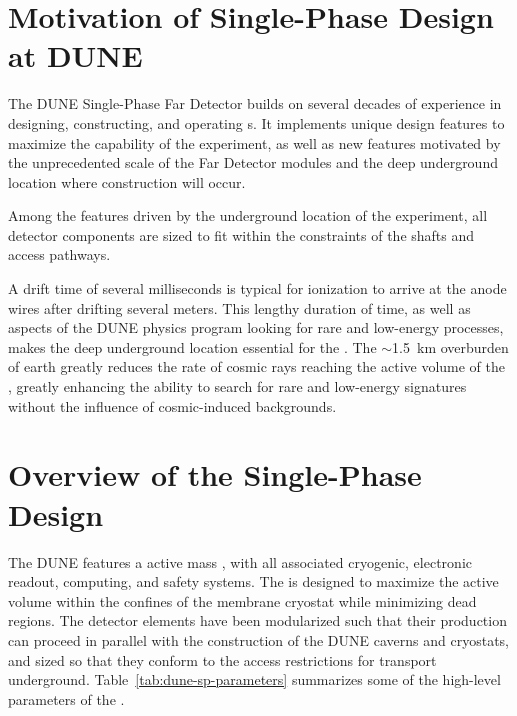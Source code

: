 \section{Motivation of Single-Phase \lartpc Design at DUNE}
\label{sec:fdsp-design-impl}

The DUNE Single-Phase Far Detector builds on several decades of experience in designing, constructing, and operating \lartpc{}s.  It implements unique design features to maximize the capability of the experiment, as well as new features motivated by the unprecedented scale of the Far Detector modules and the deep underground location where construction will occur.

Among the features driven by the underground location of the experiment, all detector components are sized to fit within the constraints of the \surf shafts and access pathways.

A drift time of several milliseconds is typical for ionization to arrive at the anode wires after drifting several meters.  This lengthy duration of time, as well as aspects of the DUNE physics program looking for rare and low-energy processes, makes the deep underground location essential for the .  The  $\sim$\SI{1.5}{km} overburden of earth greatly reduces the rate of cosmic rays reaching the active volume of the , greatly enhancing the ability to search for rare and low-energy signatures without the influence of cosmic-induced backgrounds.  


\section{Overview of the Single-Phase Design}
\label{sec:fdsp-ov-model}

The DUNE  features a \nominalmodsize active mass \lartpc, with all associated cryogenic, electronic readout, computing, and safety systems.  The  is designed to maximize the active volume within the confines of the membrane cryostat while minimizing dead regions.  The detector elements have been modularized such that their production can proceed in parallel with the construction of the DUNE caverns and cryostats, and sized so that they conform to the access restrictions for transport underground.  Table~\ref{tab:dune-sp-parameters} summarizes some of the high-level parameters of the .

